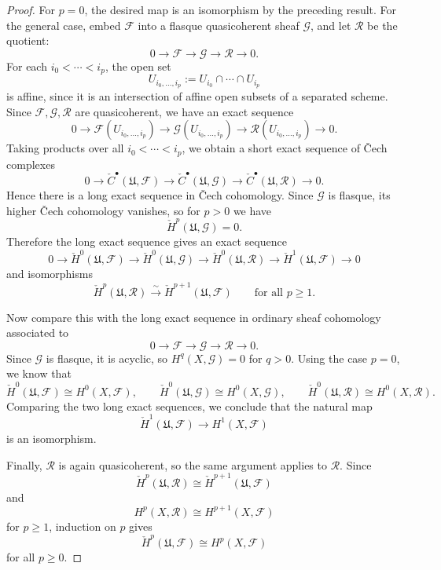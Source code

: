 \documentclass[12pt]{article}
\begin{document}
\begin{proof}
    For $p=0$, the desired map is an isomorphism by the preceding result. For the general case, embed $\mathcal F$ into a flasque quasicoherent sheaf $\mathcal G$, and let $\mathcal R$ be the quotient:
    \[
        0\to \mathcal F\to \mathcal G\to \mathcal R\to 0.
    \]
    For each $i_0<\cdots<i_p$, the open set
    \[
        U_{i_0,\dots,i_p}:=U_{i_0}\cap\cdots\cap U_{i_p}
    \]
    is affine, since it is an intersection of affine open subsets of a separated scheme. Since $\mathcal F,\mathcal G,\mathcal R$ are quasicoherent, we have an exact sequence
    \[
        0\to
        \mathcal F(U_{i_0,\dots,i_p})
        \to
        \mathcal G(U_{i_0,\dots,i_p})
        \to
        \mathcal R(U_{i_0,\dots,i_p})
        \to 0.
    \]
    Taking products over all $i_0<\cdots<i_p$, we obtain a short exact sequence of \v Cech complexes
    \[
        0\to
        \check C^\bullet(\mathfrak U,\mathcal F)
        \to
        \check C^\bullet(\mathfrak U,\mathcal G)
        \to
        \check C^\bullet(\mathfrak U,\mathcal R)
        \to 0.
    \]
    Hence there is a long exact sequence in \v Cech cohomology. Since $\mathcal G$ is flasque, its higher \v Cech cohomology vanishes, so for $p>0$ we have
    \[
        \check H^p(\mathfrak U,\mathcal G)=0.
    \]
    Therefore the long exact sequence gives an exact sequence
    \[
        0\to
        \check H^0(\mathfrak U,\mathcal F)
        \to
        \check H^0(\mathfrak U,\mathcal G)
        \to
        \check H^0(\mathfrak U,\mathcal R)
        \to
        \check H^1(\mathfrak U,\mathcal F)
        \to 0
    \]
    and isomorphisms
    \[
        \check H^p(\mathfrak U,\mathcal R)
        \xrightarrow{\sim}
        \check H^{p+1}(\mathfrak U,\mathcal F)
        \qquad
        \text{for all } p\ge 1.
    \]

    Now compare this with the long exact sequence in ordinary sheaf cohomology associated to
    \[
        0\to \mathcal F\to \mathcal G\to \mathcal R\to 0.
    \]
    Since $\mathcal G$ is flasque, it is acyclic, so $H^q(X,\mathcal G)=0$ for $q>0$. Using the case $p=0$, we know that
    \[
        \check H^0(\mathfrak U,\mathcal F)\cong H^0(X,\mathcal F),
        \qquad
        \check H^0(\mathfrak U,\mathcal G)\cong H^0(X,\mathcal G),
        \qquad
        \check H^0(\mathfrak U,\mathcal R)\cong H^0(X,\mathcal R).
    \]
    Comparing the two long exact sequences, we conclude that the natural map
    \[
        \check H^1(\mathfrak U,\mathcal F)
        \to
        H^1(X,\mathcal F)
    \]
    is an isomorphism.

    Finally, $\mathcal R$ is again quasicoherent, so the same argument applies to $\mathcal R$. Since
    \[
        \check H^p(\mathfrak U,\mathcal R)
        \cong
        \check H^{p+1}(\mathfrak U,\mathcal F)
    \]
    and
    \[
        H^p(X,\mathcal R)
        \cong
        H^{p+1}(X,\mathcal F)
    \]
    for $p\ge 1$, induction on $p$ gives
    \[
        \check H^p(\mathfrak U,\mathcal F)
        \cong
        H^p(X,\mathcal F)
    \]
    for all $p\ge 0$.
\end{proof}
\end{document}
